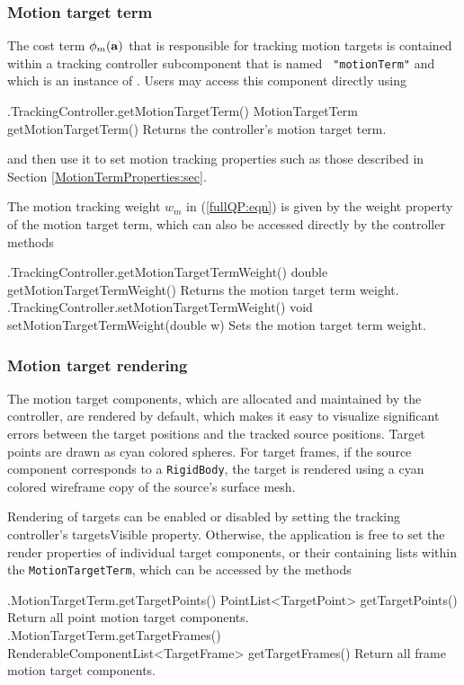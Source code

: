 \subsubsection{Motion target term}
\label{MotionTargetTerm:sec}

The cost term $\phi_m({\bf a})$ that is responsible for tracking motion targets is
contained within a tracking controller subcomponent that is named {\tt
"motionTerm"} and which is an instance of
. Users 
may access this component directly using
%
\begin{methodtable}{0.58}{0.42}
\midline
%
\methodentry
{\inverse.TrackingController.getMotionTargetTerm()}%
{MotionTargetTerm getMotionTargetTerm()}%
{Returns the controller's motion target term.}%
%
\midline
\end{methodtable}
%
and then use it to set motion tracking properties such as those described in
Section \ref{MotionTermProperties:sec}.

The motion tracking weight $w_m$ in (\ref{fullQP:eqn}) is
given by the {\sf weight} property of the motion target term,
which can also be accessed directly by the controller methods
%
\begin{methodtable}{0.58}{0.42}
\midline
%
\methodentry
{\inverse.TrackingController.getMotionTargetTermWeight()}%
{double getMotionTargetTermWeight()}%
{Returns the motion target term weight.}%
%
\methodentry
{\inverse.TrackingController.setMotionTargetTermWeight()}%
{void setMotionTargetTermWeight(double w)}%
{Sets the motion target term weight.}%
%
\midline
\end{methodtable}
%

\subsubsection{Motion target rendering}
\label{MotionTargetRendering:sec}

The motion target components, which are allocated and maintained by the
controller, are rendered by default, which makes it easy to visualize
significant errors between the target positions and the tracked source
positions. Target points are drawn as cyan colored spheres.  For target frames,
if the source component corresponds to a {\tt RigidBody}, the target is
rendered using a cyan colored wireframe copy of the source's surface mesh.

Rendering of targets can be enabled or disabled by setting the tracking
controller's {\sf targetsVisible} property. Otherwise, the application is free
to set the render properties of individual target components, or their
containing lists within the {\tt MotionTargetTerm}, which can
be accessed by the methods
%
\begin{methodtable}{0.58}{0.42}
\midline
%
\methodentry
{\inverse.MotionTargetTerm.getTargetPoints()}%
{PointList<TargetPoint> getTargetPoints()}%
{Return all point motion target components.}%
%
\methodentry
{\inverse.MotionTargetTerm.getTargetFrames()}%
{RenderableComponentList<TargetFrame> getTargetFrames()}%
{Return all frame motion target components.}%
%
\midline
\end{methodtable}
%

